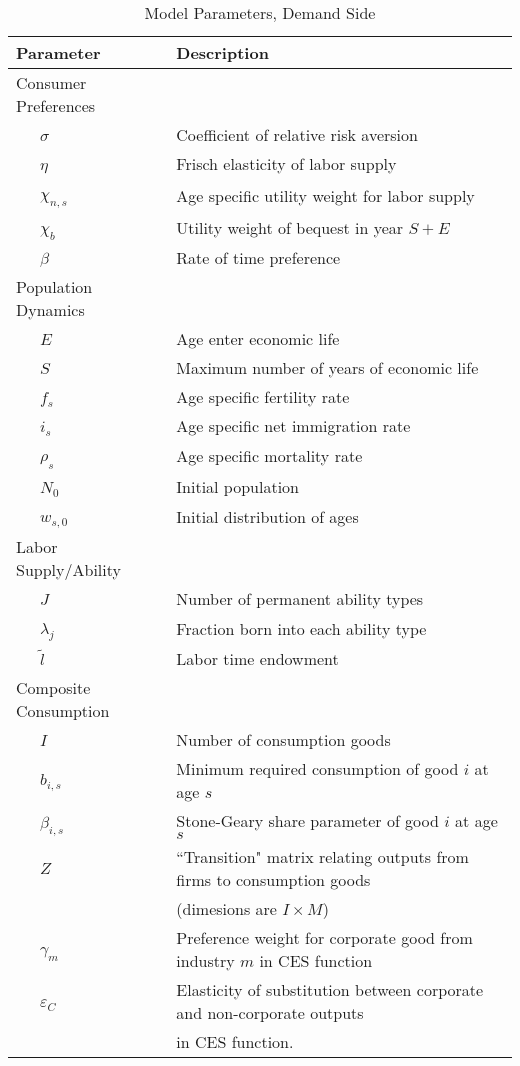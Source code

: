 \documentclass[article,11pt,letterpaper,fleqn]{article}
\theoremstyle{definition}
\numberwithin{equation}{section}
\begin{document}
\begin{table}[htbp]
  \centering
  \caption{Model Parameters, Demand Side}
    \begin{tabular}{ll}
    \hline
    \hline
    Parameter & Description \\
    \hline
    Consumer Preferences &  \\
    \ \ \ $\sigma$ & Coefficient of relative risk aversion \\
    \ \ \ $\eta$ & Frisch elasticity of labor supply \\
    \ \ \ $\chi_{n,s}$ & Age specific utility weight for labor supply \\
    \ \ \ $\chi_{b}$ & Utility weight of bequest in year $S+E$ \\
    \ \ \ $\beta$ & Rate of time preference \\
    Population Dynamics &  \\
    \ \ \ $E$ & Age enter economic life \\
    \ \ \ $S$ & Maximum number of years of economic life \\
    \ \ \ $f_{s}$ & Age specific fertility rate \\
    \ \ \ $i_{s}$ & Age specific net immigration rate \\
    \ \ \ $\rho_{s}$ & Age specific mortality rate \\
    \ \ \ $N_{0}$ & Initial population \\
    \ \ \ $w_{s,0}$ & Initial distribution of ages \\
    Labor Supply/Ability &  \\
    \ \ \ $J$ & Number of permanent ability types \\
    \ \ \ $\lambda_{j}$ & Fraction born into each ability type \\
    \ \ \ $\tilde{l}$ & Labor time endowment \\
    Composite Consumption &  \\
    \ \ \ $I$ & Number of consumption goods \\
    \ \ \ $b_{i,s}$ & Minimum required consumption of good $i$ at age $s$ \\
    \ \ \ $\beta_{i,s}$ & Stone-Geary share parameter of good $i$ at age $s$ \\
    \ \ \ $Z$ & ``Transition" matrix relating outputs from firms to consumption goods \\
     & (dimesions are $I\times M$) \\
    \ \ \ $\gamma_{m}$ & Preference weight for corporate good from industry $m$ in CES function  \\
    \ \ \ $\varepsilon_{C}$ & Elasticity of substitution between corporate and non-corporate outputs \\
    &  in CES function. \\
    \hline
    \hline
    \end{tabular}%
  \label{tab:params_demand}%
\end{table}%
\end{document}
